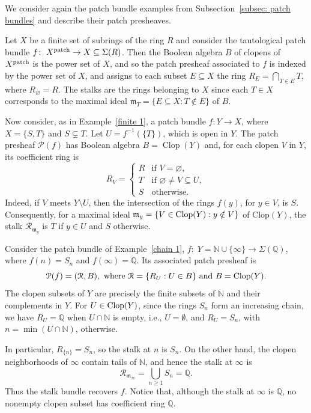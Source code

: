 \documentclass[11pt]{amsart}
\begin{document}
We consider again the patch bundle examples from Subsection~\ref{subsec: patch bundles} and describe their patch presheaves. 


\begin{example} \label{finite 2}
Let $X$ be a finite set of subrings of the ring $R$ and consider the tautological patch bundle $f\colon\; X^{\rm patch} \rightarrow X \subseteq \Sigma(R)$. Then the Boolean algebra $B$ of clopens of $X^{\rm patch}$ is the power set of $X$, and so the patch presheaf associated to $f$ is indexed by
the power set of $X$, and assigns to each subset $E\subseteq X$ the ring $R_E=\bigcap_{T\in E}T$, where $R_\varnothing = R$.
The stalks are the rings belonging to $X$ since each $T\in X$ corresponds to the maximal ideal $\mathfrak m_T=\{E\subseteq X:T\notin E\}$
of $B$.


Now consider, as in Example~\ref{finite 1}, a patch bundle $f\colon Y\to X$, where $X=\{S,T\}$ and $S\subsetneq T$. Let $U=f^{-1}(\{T\})$, which is open in $Y$. The patch presheaf ${\mathcal P}(f)$ has Boolean algebra $B=\operatorname{Clop}(Y)$ and, for each clopen $V$ in $Y$, its
coefficient ring is
\[
R_V=
\begin{cases}
R & \text{if } V=\varnothing,\\
T & \text{if } \varnothing\ne V\subseteq U,\\
S & \text{otherwise}.
\end{cases}
\]
Indeed, if $V$ meets $Y\setminus U$, then the intersection of the rings $f(y)$, for $y\in V$, is $S$. 
Consequently, for a maximal ideal $ \mathfrak m_y=\{V\in{\rm Clop}(Y):y\notin V\}$ of Clop$(Y)$,  the stalk $
\mathcal R_{\mathfrak m_y}$ is $
T$ if $y\in U$ and $S$ otherwise. 
\end{example}

\begin{example} \label{chain 2}
Consider the patch bundle of Example~\ref{chain 1},
$f\colon\; Y=\mathbb N\cup\{\infty\}\rightarrow\Sigma(\mathbb Q),$ where $ f(n)=S_n $ and $f(\infty)=\mathbb Q.$
Its associated patch presheaf is
$$
\mathcal P(f)=(\mathcal R,B), {\mbox{ 
where }}
\mathcal R=\{R_U:U\in B\} {\mbox{ and }}  
B={\rm Clop}(Y).$$ The clopen subsets of $Y$ are precisely the finite subsets of $\mathbb N$ and their complements in $Y$. For $U\in {\rm Clop}(Y)$, since the rings $S_n$ form an increasing chain, we have $R_U = {\mathbb{Q}}$ when $U \cap {\mathbb N}$ is empty, i.e.,  $U= \emptyset$, and $R_U = S_n$, with $n = \min(U \cap {\mathbb N})$, otherwise. 

In particular, $R_{\{n\}}=S_n$, so the stalk at $n$ is $S_n$. On the other hand, the clopen neighborhoods of $\infty$ contain tails of
$\mathbb N$, and hence the stalk at $\infty$ is
\[
\mathcal R_{\mathfrak m_\infty}
=\bigcup_{n\geq 1}S_n=\mathbb Q.
\]
Thus the stalk bundle recovers $f$. Notice that, although the stalk at $\infty$ is $\mathbb Q$, no nonempty clopen subset
has coefficient ring $\mathbb Q$.
\end{example}
\end{document}
